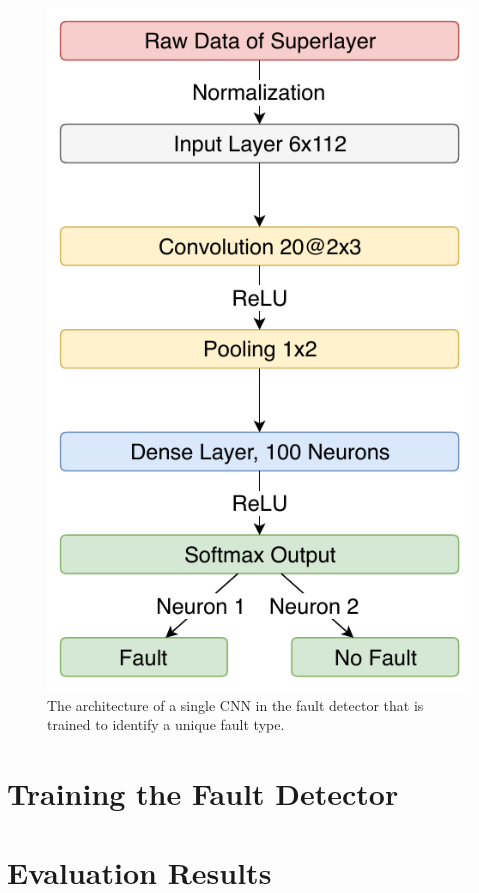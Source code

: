 \begin{figure}[h]
  \centering
  \includegraphics[height=.5\textheight]{../figures/fault_architecture}
  \caption{The architecture of a single CNN in the fault detector that
  is trained to identify a unique fault type.}
  \label{fig:fault-architecture}
\end{figure}

\section{Training the Fault Detector}

\section{Evaluation Results}
